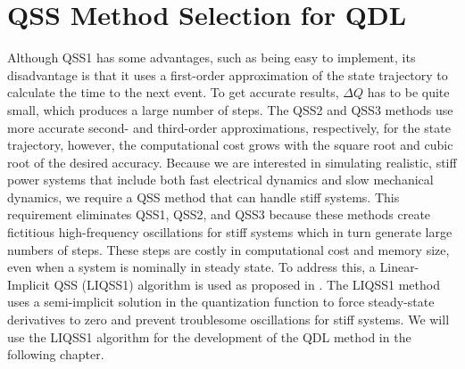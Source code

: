 \section{QSS Method Selection for QDL}

Although QSS1 has some advantages, such as being easy to implement, its disadvantage is that it uses a first-order approximation of the state trajectory to calculate the time to the next event. To get accurate results, $\Delta Q$ has to be quite small, which produces a large number of steps. The QSS2 \cite{kofman2002} and QSS3 \cite{kofman2006} methods use more accurate second- and third-order approximations, respectively, for the state trajectory, however, the computational cost grows with the square root and cubic root of the desired accuracy. Because we are interested in simulating realistic, stiff power systems that include both fast electrical dynamics and slow mechanical dynamics, we require a QSS method that can handle stiff systems. This requirement eliminates QSS1, QSS2, and QSS3 because these methods create fictitious high-frequency oscillations for stiff systems which in turn generate large numbers of steps. These steps are costly in computational cost and memory size, even when a system is nominally in steady state. To address this, a Linear-Implicit QSS (LIQSS1) algorithm is used as proposed in \cite{migoni2009}. The LIQSS1 method uses a semi-implicit solution in the quantization function to force steady-state derivatives to zero and prevent troublesome oscillations for stiff systems. We will use the LIQSS1 algorithm for the development of the QDL method in the following chapter.
